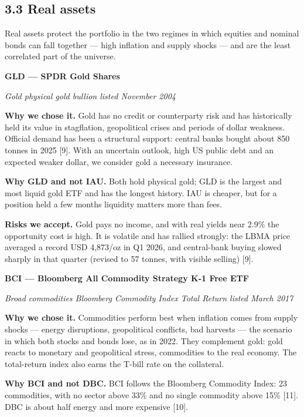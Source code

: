 \documentclass[
]{article}
\begin{document}
\hypertarget{real-assets}{%
\subsection{3.3 Real assets}\label{real-assets}}

Real assets protect the portfolio in the two regimes in which equities
and nominal bonds can fall together --- high inflation and supply shocks
--- and are the least correlated part of the universe.

\textbf{GLD --- SPDR Gold Shares}

\emph{Gold \textperiodcentered{} physical gold bullion \textperiodcentered{} listed November 2004}

\textbf{Why we chose it.} Gold has no credit or counterparty risk and
has historically held its value in stagflation, geopolitical crises and
periods of dollar weakness. Official demand has been a structural
support: central banks bought about 850 tonnes in 2025 {[}9{]}. With an
uncertain outlook, high US public debt and an expected weaker dollar, we
consider gold a necessary insurance.

\textbf{Why GLD and not IAU.} Both hold physical gold; GLD is the
largest and most liquid gold ETF and has the longest history. IAU is
cheaper, but for a position held a few months liquidity matters more
than fees.

\textbf{Risks we accept.} Gold pays no income, and with real yields near
2.9\% the opportunity cost is high. It is volatile and has rallied
strongly: the LBMA price averaged a record USD 4,873/oz in Q1 2026, and
central-bank buying slowed sharply in that quarter (revised to 57
tonnes, with visible selling) {[}9{]}.

\textbf{BCI --- Bloomberg All Commodity Strategy K-1 Free ETF}

\emph{Broad commodities \textperiodcentered{} Bloomberg Commodity Index Total Return \textperiodcentered{}
listed March 2017}

\textbf{Why we chose it.} Commodities perform best when inflation comes
from supply shocks --- energy disruptions, geopolitical conflicts, bad
harvests --- the scenario in which both stocks and bonds lose, as in
2022. They complement gold: gold reacts to monetary and geopolitical
stress, commodities to the real economy. The total-return index also
earns the T-bill rate on the collateral.

\textbf{Why BCI and not DBC.} BCI follows the Bloomberg Commodity Index:
23 commodities, with no sector above 33\% and no single commodity above
15\% {[}11{]}. DBC is about half energy and more expensive {[}10{]}.
\end{document}
